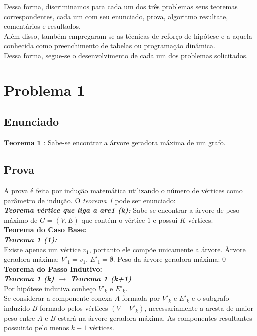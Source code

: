 \documentclass[12pt]{article}
\begin{document}
Dessa forma, discriminamos para cada um dos três problemas seus teoremas correspondentes, cada um com seu enunciado, prova,  algoritmo resultate, comentários e resultados.\\

Além disso, também empregaram-se as técnicas de reforço de hipótese e a aquela conhecida como preenchimento de tabelas ou programação dinâmica.\\

Dessa forma, segue-se o desenvolvimento de cada um dos problemas solicitados.\\

\section{Problema 1}

\subsection{ Enunciado }
\indent  $\mathbf{Teorema}$ $\mathbf{1}$ : Sabe-se encontrar a árvore geradora máxima de um grafo.

\subsection{ Prova }
\indent A prova é feita por indução matemática utilizando o número de vértices como parâmetro de indução. O \textit{teorema 1} pode ser enunciado:\\

\textit{\textbf{Teorema vértice que liga a are1 (k):}} Sabe-se encontrar a árvore de peso máximo de $G=(V,E)$ que contém o vértice $1$ e possui $K$ vértices.\\

\textbf{Teorema do Caso Base:}\\

\textit{\textbf{Teorema 1 (1):}}\\
Existe apenas um vértice $v_1$, portanto ele compõe unicamente a árvore.
Àrvore geradora máxima: $V'_1 = {v_1}$, $E'_1 = \emptyset$.
Peso da árvore geradora máxima: 0\\

\textbf{Teorema do Passo Indutivo:}\\

\textit{\textbf{Teorema 1 (k) $\rightarrow$ Teorema 1 (k+1)}}\\
Por hipótese indutiva conheço $V'_k$ e $E'_k$.\\
Se considerar a componente conexa $A$ formada por $V'_k$ e $E'_k$ e o subgrafo induzido $B$ formado pelos
vértices $\left(V - V'_k\right)$, necessariamente a aresta de maior peso entre $A$ e $B$ estará na árvore geradora máxima. As componentes resultantes possuirão
pelo menos $k+1$ vértices.\\
\end{document}
